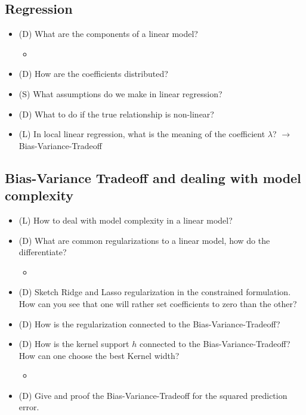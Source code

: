 \subsection*{Regression}

\begin{itemize}
    \item (D) What are the components of a linear model?
    \begin{itemize}
        \item {}
    \end{itemize}
    \item (D) How are the coefficients distributed?
    \item (S) What assumptions do we make in linear regression?
    \item (D) What to do if the true relationship is non-linear?
    \item (L) In local linear regression, what is the meaning of the coefficient $\lambda$? $\rightarrow$ Bias-Variance-Tradeoff
\end{itemize}

\subsection*{Bias-Variance Tradeoff and dealing with model complexity}

\begin{itemize}
    \item (L) How to deal with model complexity in a linear model?
    \item (D) What are common regularizations to a linear model, how do the differentiate?
    \begin{itemize}
        \item {}
    \end{itemize}
    \item (D) Sketch Ridge and Lasso regularization in the constrained formulation. How can you
    see that one will rather set coefficients to zero than the other?
    \item (D) How is the regularization connected to the Bias-Variance-Tradeoff?
    \item (D) How is the kernel support $h$ connected to the Bias-Variance-Tradeoff? How can one choose the best Kernel width?
    \begin{itemize}
        \item {}
    \end{itemize}
    \item (D) Give and proof the Bias-Variance-Tradeoff for the squared prediction error.
\end{itemize}

